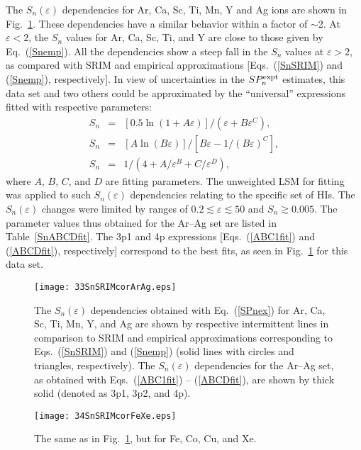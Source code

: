 \documentclass[aps,pra,twocolumn,amsmath,amssymb,floatfix]{revtex4-2}
\begin{document}
The $S_{n}(\varepsilon)$ dependencies for Ar, Ca, Sc, Ti, Mn, Y and Ag ions are shown in Fig.~\ref{SnArAg}. These dependencies have a similar behavior within a factor of $\sim$2. At $\varepsilon < 2$, the $S_{n}$ values for Ar, Ca, Sc, Ti, and Y are close to those given by Eq.~(\ref{Snemp}). All the dependencies show a steep fall in the $S_{n}$ values at $\varepsilon > 2$, as compared with SRIM and empirical approximations [Eqs.~(\ref{SnSRIM}) and (\ref{Snemp}), respectively]. In view of uncertainties in the $SP_{n}^{\rm expt}$ estimates, this data set and two others could be approximated by the ``universal'' expressions \cite{Wilson77} fitted with respective parameters:
\begin{eqnarray}
  S_{n} &=& [0.5 \ln(1 + A \varepsilon)] / (\varepsilon + B \varepsilon^C), \label{ABC1fit}  \\
  S_{n} &=& [A \ln(B \varepsilon)] / [B \varepsilon - 1 / (B \varepsilon)^C],  \label{ABC2fit}  \\
  S_{n} &=& 1/(4 + A / \varepsilon^B + C /  \varepsilon^D),  \label{ABCDfit}
\end{eqnarray}
where $A$, $B$, $C$, and $D$ are fitting parameters. The unweighted LSM for fitting was applied to such $S_{n}(\varepsilon)$ dependencies relating to the specific set of HIs. The $S_{n}(\varepsilon)$ changes were limited by ranges of $0.2 \lesssim \varepsilon \lesssim 50$ and $S_{n} \gtrsim 0.005$. The parameter values thus obtained for the Ar--Ag set are listed in Table~\ref{SnABCDfit}. The 3p1 and 4p expressions [Eqs.~(\ref{ABC1fit}) and (\ref{ABCDfit}), respectively] correspond to the best fits, as seen in Fig.~\ref{SnArAg} for this data set.

\begin{figure}[!h]  %
\begin{center}
\texttt{[image: 33SnSRIMcorArAg.eps]}
\caption{\label{SnArAg} The $S_{n}(\varepsilon)$ dependencies obtained with Eq.~(\ref{SPnex}) for Ar, Ca, Sc, Ti, Mn, Y, and Ag are shown by respective intermittent lines in comparison to SRIM and empirical approximations \cite{SRIM,Garnir80} corresponding to Eqs.~(\ref{SnSRIM}) and (\ref{Snemp}) (solid lines with circles and triangles, respectively). The $S_{n}(\varepsilon)$ dependencies for the Ar--Ag set, as obtained with Eqs.~(\ref{ABC1fit}) -- (\ref{ABCDfit}), are shown by thick solid (denoted as 3p1, 3p2, and 4p).}
\end{center}
\end{figure}

\begin{figure}[!h]  %
\begin{center}
\texttt{[image: 34SnSRIMcorFeXe.eps]}
\caption{\label{SnFeXe} The same as in Fig.~\ref{SnArAg}, but for Fe, Co, Cu, and Xe.}
\end{center}
\end{figure}
\end{document}
